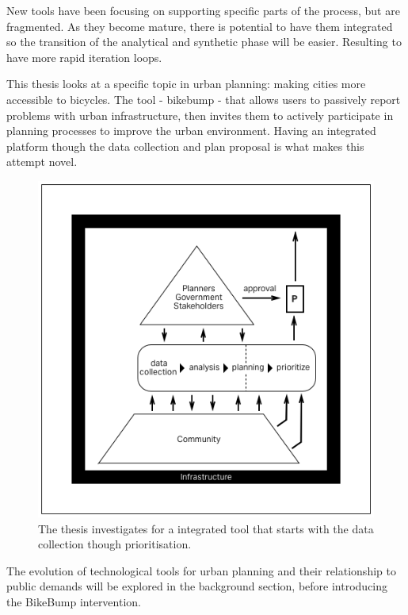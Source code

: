 New tools have been focusing on supporting specific parts of the process, but are fragmented.
As they become mature, there is potential to have them integrated so the transition of the analytical and synthetic phase will be easier. Resulting to have more rapid iteration loops.

This thesis looks at a specific topic in urban planning: making cities more accessible to bicycles. The tool - bikebump - that allows users to passively report problems with urban infrastructure, then invites them to actively participate in planning processes to improve the urban environment. Having an integrated platform though the data collection and plan proposal is what makes this attempt novel.

\begin{figure}[!htb]
 	\includegraphics[width=\textwidth]{chapters/1/fig/bikebump.png}               
 	 \caption[diagram: bikebump]{The thesis investigates for a integrated tool that starts with the data collection though prioritisation.}
  	\label{fig:diagram_bikebump}
\end{figure}

The evolution of technological tools for urban planning and their relationship to public demands will be explored in the background section, before introducing the BikeBump intervention. 

